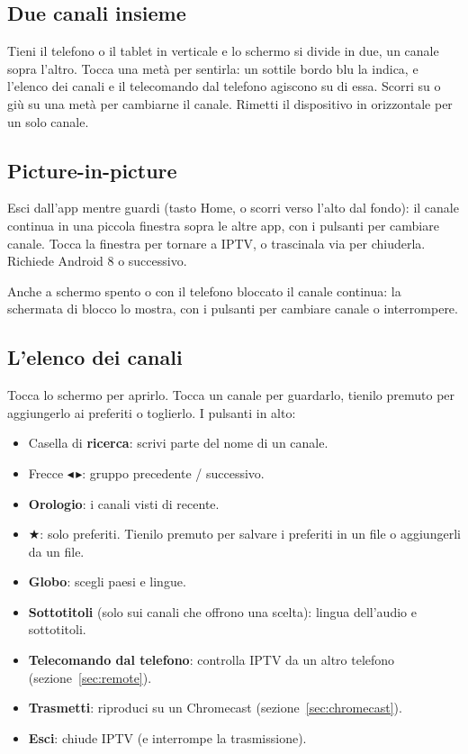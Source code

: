 \subsection{Due canali insieme}
Tieni il telefono o il tablet in verticale e lo schermo si divide in due, un
canale sopra l'altro. Tocca una metà per sentirla: un sottile bordo blu la
indica, e l'elenco dei canali e il telecomando dal telefono agiscono su di
essa. Scorri su o giù su una metà per cambiarne il canale. Rimetti il
dispositivo in orizzontale per un solo canale.

\subsection{Picture-in-picture}
Esci dall'app mentre guardi (tasto Home, o scorri verso l'alto dal fondo):
il canale continua in una piccola finestra sopra le altre app, con i pulsanti
per cambiare canale. Tocca la finestra per tornare a IPTV, o trascinala via
per chiuderla. Richiede Android 8 o successivo.

Anche a schermo spento o con il telefono bloccato il canale continua: la
schermata di blocco lo mostra, con i pulsanti per cambiare canale o
interrompere.

\subsection{L'elenco dei canali}
Tocca lo schermo per aprirlo. Tocca un canale per guardarlo, tienilo premuto
per aggiungerlo ai preferiti o toglierlo. I pulsanti in alto:
\begin{itemize}
  \item Casella di \textbf{ricerca}: scrivi parte del nome di un canale.
  \item Frecce $\blacktriangleleft$\,$\blacktriangleright$: gruppo
        precedente / successivo.
  \item \textbf{Orologio}: i canali visti di recente.
  \item $\bigstar$: solo preferiti. Tienilo premuto per salvare i preferiti in
        un file o aggiungerli da un file.
  \item \textbf{Globo}: scegli paesi e lingue.
  \item \textbf{Sottotitoli} (solo sui canali che offrono una scelta): lingua
        dell'audio e sottotitoli.
  \item \textbf{Telecomando dal telefono}: controlla IPTV da un altro
        telefono (sezione~\ref{sec:remote}).
  \item \textbf{Trasmetti}: riproduci su un Chromecast
        (sezione~\ref{sec:chromecast}).
  \item \textbf{Esci}: chiude IPTV (e interrompe la trasmissione).
\end{itemize}

